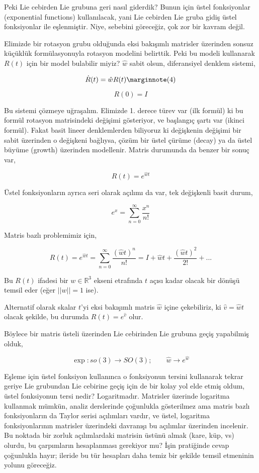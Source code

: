 \documentclass[12pt,fleqn]{article}\usepackage{../../common}
\begin{document}
Peki Lie cebirden Lie grubuna geri nasıl giderdik? Bunun için üstel
fonksiyonlar (exponential functions) kullanılacak, yani Lie cebirden Lie
gruba gidiş üstel fonksiyonlar ile eşlenmiştir. Niye, sebebini göreceğiz,
çok zor bir kavram değil.  

Elimizde bir rotasyon grubu olduğunda eksi bakışımlı matrisler üzerinden
sonsuz küçüklük formülasyonuyla rotasyon modelini belirttik. Peki bu modeli
kullanarak $R(t)$ için bir model bulabilir miyiz? $\hat{w}$ sabit olsun,
diferansiyel denklem sistemi, 

$$ 
\dot{R}(t) = \hat{w} R(t) 
\mlabel{4}
$$

$$ R(0) = I $$

Bu sistemi çözmeye uğraşalım. Elimizde 1. derece türev var (ilk formül) ki
bu formül rotasyon matrisindeki değişimi gösteriyor, ve başlangıç şartı var
(ikinci formül). Fakat basit lineer denklemlerden biliyoruz ki değişkenin
değişimi bir sabit üzerinden o değişkeni bağlıysa, çözüm bir üstel çürüme
(decay) ya da üstel büyüme (growth) üzerinden modellenir. Matris durumunda
da benzer bir sonuç var,

$$ R(t) = e^{\hat{w} t} $$

Üstel fonksiyonların ayrıca seri olarak açılımı da var, tek değişkenli
basit durum,

$$ e^x = \sum_{n=0}^{\infty} \frac{x^n}{n!}  $$

Matris bazlı problemimiz için,

$$ R(t) = e^{\hat{w} t} = 
\sum_{n=0}^{\infty} \frac{(\hat{w}t)^n}{n!} = I + \hat{w}t + \frac{(\hat{w}t)^2}{2!}+...
$$

Bu $R(t)$ ifadesi bir $w \in \mathbb{R}^3$ ekseni etrafında $t$ açısı kadar
olacak bir dönüşü temsil eder (eğer $||w||=1$ ise). 

Alternatif olarak skalar $t$'yi eksi bakışımlı matris $\hat{w}$ içine
çekebiliriz, ki $\hat{v} = \hat{w}t$ olacak şekilde, bu durumda 
$R(t) = e^{\hat{v}}$ olur. 

Böylece bir matris üsteli üzerinden Lie cebirinden Lie grubuna geçiş
yapabilmiş olduk, 

$$ \exp: so(3) \to SO(3); \qquad \hat{w} \to e^{\hat{w}} $$

Eşleme için üstel fonksiyon kullanınca o fonksiyonun tersini kullanarak
tekrar geriye Lie grubundan Lie cebirine geçiş için de bir kolay yol elde
etmiş oldum, üstel fonksiyonun tersi nedir? Logaritmadır. Matrisler
üzerinde logaritma kullanmak mümkün, analiz derslerinde çoğunlukla
gösterilmez ama matris bazlı fonksiyonların da Taylor serisi açılımları
vardır, ve üstel, logaritma fonksiyonlarının matrisler üzerindeki davranışı
bu açılımlar üzerinden incelenir. Bu noktada bir zorluk açılımlardaki
matrisin üstünü almak (kare, küp, vs) olurdu, bu çarpımların hesaplanması
gerekiyor mu? İşin pratiğinde cevap çoğunlukla hayır; ileride bu tür
hesapları daha temiz bir şekilde temsil etmeninin yolunu göreceğiz.
\end{document}
